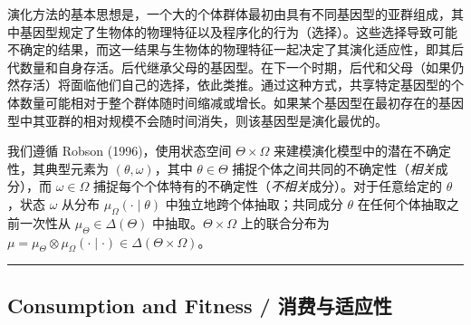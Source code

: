 \documentclass[12pt,a4paper]{article}
\newenvironment{translation}
  {\par\noindent\color{blue!70!black}\smallskip}
  {\par\medskip\hrule\medskip}
\begin{document}
\begin{translation}
演化方法的基本思想是，一个大的个体群体最初由具有不同基因型的亚群组成，其中基因型规定了生物体的物理特征以及程序化的行为（选择）。这些选择导致可能不确定的结果，而这一结果与生物体的物理特征一起决定了其演化适应性，即其后代数量和自身存活。后代继承父母的基因型。在下一个时期，后代和父母（如果仍然存活）将面临他们自己的选择，依此类推。通过这种方式，共享特定基因型的个体数量可能相对于整个群体随时间缩减或增长。如果某个基因型在最初存在的基因型中其亚群的相对规模不会随时间消失，则该基因型是演化最优的。

我们遵循 Robson (1996)，使用状态空间 $\Theta \times \Omega$ 来建模演化模型中的潜在不确定性，其典型元素为 $(\theta, \omega)$，其中 $\theta \in \Theta$ 捕捉个体之间共同的不确定性（\emph{相关}成分），而 $\omega \in \Omega$ 捕捉每个个体特有的不确定性（\emph{不相关}成分）。对于任意给定的 $\theta$，状态 $\omega$ 从分布 $\mu_\Omega(\cdot \mid \theta)$ 中独立地跨个体抽取；共同成分 $\theta$ 在任何个体抽取之前一次性从 $\mu_\Theta \in \Delta(\Theta)$ 中抽取。$\Theta \times \Omega$ 上的联合分布为 $\mu = \mu_\Theta \otimes \mu_\Omega(\cdot \mid \cdot) \in \Delta(\Theta \times \Omega)$。
\end{translation}

\subsection{Consumption and Fitness / 消费与适应性}
\end{document}
